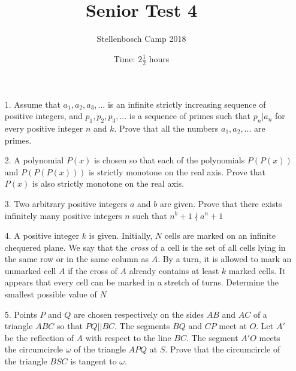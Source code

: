 \documentclass[a4paper, 12pt]{article}
\title{Senior Test 4}
\author{Stellenbosch Camp 2018}
\date{Time: $2 \frac{1}{2}$ hours}
\begin{document}
 \maketitle

\begin{enumerate}
\item[1.]Assume that $a_1,a_2,a_3,...$ is an infinite strictly increasing sequence of positive integers, and $p_1,p_2,p_3,...$ is a sequence of primes such that $p_n | a_n$ for every positive integer $n$ and $k$. Prove that all the numbers $a_1,a_2,...$ are primes.
\vspace{7pt}

\item[2.]A polynomial $P(x)$ is chosen so that each of the polynomials $P(P(x)) $ and $P(P(P(x))) $ is strictly monotone on the real axis. Prove that $P(x)$ is also strictly monotone on the real axis.

\item[3.]Two arbitrary positive integers $a$ and $b$ are given. Prove that there exists infinitely many positive integers $n$ such that $n^b +1 \nmid a^n +1$

\vspace{5pt}

\item[4.]A positive integer $k$ is given. Initially, $N$ cells are marked on an infinite chequered plane. We say that the \textit{cross} of a cell is the set of all cells lying in the same row or in the same column as $A$. By a turn, it is allowed to mark an unmarked cell $A$ if the cross of $A$ already contains at least $k$ marked cells. It appears that every cell can be marked in a stretch of turns. Determine the smallest possible value of $N$
\vspace{7pt}

\item[5.]Points $P$ and $Q$ are chosen respectively on the sides $AB$ and $AC$ of a triangle $ABC$ so that $PQ||BC$. The segments $BQ$ and $CP$ meet at $O$. Let $A'$ be the reflection of $A$ with respect to the line $BC$. The segment $A'O$ meets the circumcircle $\omega$ of the triangle $APQ$ at $S$. Prove that the circumcircle of the triangle $BSC$ is tangent to $\omega$.
\vspace{7pt}


\end{enumerate}
\end{document}
